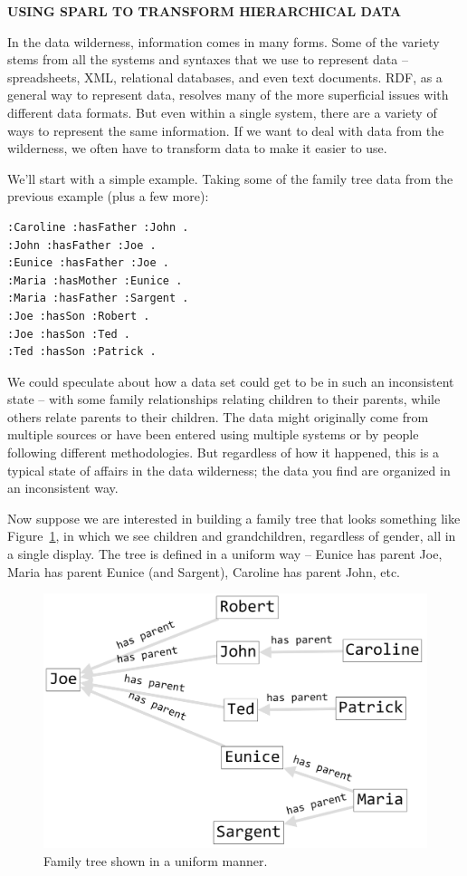 \begin{challenge}
\textbf{USING SPARL TO TRANSFORM HIERARCHICAL DATA}
\label{chal:2}


In the data wilderness, information comes in many forms. Some of the
variety stems from all the systems and syntaxes that we use to represent
data -- spreadsheets, XML, relational databases, and even text
documents. RDF, as a general way to represent data, resolves many of the
more superficial issues with different data formats. But even within a
single system, there are a variety of ways to represent the same
information. If we want to deal with data from the wilderness, we often
have to transform data to make it easier to use.

We'll start with a simple example. Taking some of the family tree data
from the previous example (plus a few more):

\begin{lstlisting}
:Caroline :hasFather :John .
:John :hasFather :Joe .
:Eunice :hasFather :Joe .
:Maria :hasMother :Eunice .
:Maria :hasFather :Sargent .
:Joe :hasSon :Robert .
:Joe :hasSon :Ted .
:Ted :hasSon :Patrick .
\end{lstlisting}

We could speculate about how a data set could get to be in such an
inconsistent state -- with some family relationships relating children
to their parents, while others relate parents to their children. The
data might originally come from multiple sources or have been entered
using multiple systems or by people following different methodologies.
But regardless of how it happened, this is a typical state of affairs in
the data wilderness; the data you find are organized in an inconsistent
way.

Now suppose we are interested in building a family tree that looks
something like Figure~\ref{fig:ch6.9}, in which we see children and grandchildren,
regardless of gender, all in a single display. The tree is defined in a
uniform way -- Eunice has parent Joe, Maria has parent Eunice (and
Sargent), Caroline has parent John, etc.

\begin{figure}
\centering
\includegraphics[width=5in]{SWWOv3/media/ch6/figure6-9.png}
\caption{Family tree shown in a uniform manner.}
\label{fig:ch6.9}
\end{figure}


\end{challenge}

